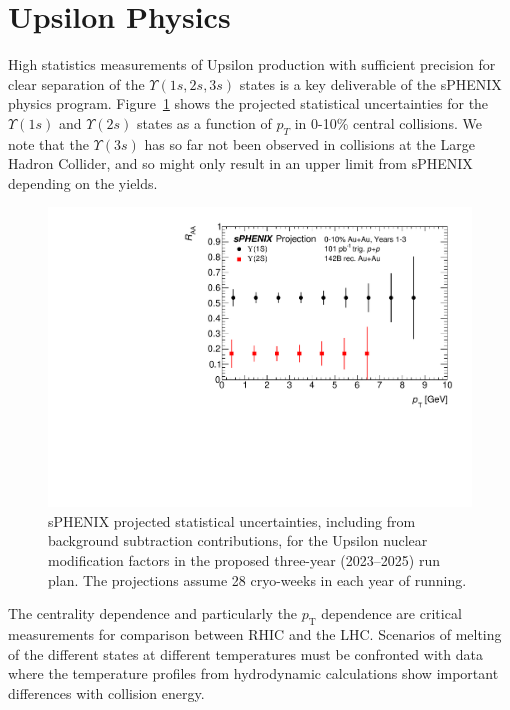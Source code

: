 \section{Upsilon Physics}
\label{sec:upsilon}

High statistics measurements of Upsilon production with sufficient
precision for clear separation of the $\Upsilon(1s,2s,3s)$ states is a
key deliverable of the sPHENIX physics program.
Figure~\ref{fig:upsilon3years} shows the projected statistical
uncertainties for the $\Upsilon(1s)$ and $\Upsilon(2s)$ states as a
function of $p_{T}$ in 0-10\% central \auau collisions.  We note that
the $\Upsilon(3s)$ has so far not been observed in \pbpb collisions at
the Large Hadron Collider, and so might only result in an upper limit
from sPHENIX depending on the yields.


\begin{figure}[h]
    \centering
    \includegraphics[width=0.65\linewidth]{figs/upsilon_RAA_1.pdf}
    \caption{sPHENIX projected statistical uncertainties, including
      from background subtraction contributions, for the Upsilon
      nuclear modification factors in the proposed three-year
      (2023--2025) run plan.   The projections assume 28
      cryo-weeks in each year of running. 
      \label{fig:upsilon3years}}
\end{figure}

The centrality dependence and particularly the $p_\mathrm{T}$ dependence are critical measurements for comparison between RHIC and the LHC.    Scenarios of melting of the different states at different temperatures must be confronted with data where the temperature profiles from hydrodynamic calculations show important differences with collision energy.

